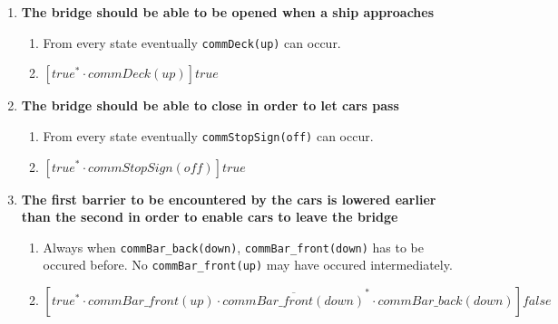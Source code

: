 \begin{enumerate}
	\item \textbf{The bridge should be able to be opened when a ship approaches}
	\begin{enumerate}
		\item From every state eventually \texttt{commDeck(up)} can occur.
		\item $[true^* \cdot commDeck(up)]true$
	\end{enumerate}

	\item \textbf{The bridge should be able to close in order to let cars pass}
	\begin{enumerate}
		\item From every state eventually \texttt{commStopSign(off)} can occur.
		\item $[true^* \cdot commStopSign(off)]true$
	\end{enumerate}

	\item \textbf{The first barrier to be encountered by the cars is lowered earlier than the second in order to enable cars to leave the bridge}
	\begin{enumerate}
		\item Always when \texttt{commBar\_back(down)}, \texttt{commBar\_front(down)} has to be occured before. No \texttt{commBar\_front(up)} may have occured intermediately.
		\item $[true^* \cdot commBar\_front(up) \cdot \overline{commBar\_front(down)}^{*} \cdot commBar\_back(down)]false$\\
	\end{enumerate}



\end{enumerate}

\newpage
